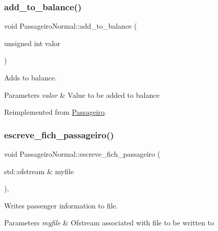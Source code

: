 \subsubsection{\texorpdfstring{add\+\_\+to\+\_\+balance()}{add\_to\_balance()}}
{\footnotesize\ttfamily void Passageiro\+Normal\+::add\+\_\+to\+\_\+balance (\begin{DoxyParamCaption}\item[{unsigned int}]{valor }\end{DoxyParamCaption})\hspace{0.3cm}{\ttfamily [virtual]}}



Adds to balance. 


\begin{DoxyParams}{Parameters}
{\em valor} & Value to be added to balance \\
\hline
\end{DoxyParams}


Reimplemented from \hyperlink{class_passageiro_ac7da59960d323e9bc75dda2e34d7a254}{Passageiro}.

\mbox{\label{class_passageiro_normal_a86e91d053cc146d645dbc8356ea28d35}} 
\subsubsection{\texorpdfstring{escreve\+\_\+fich\+\_\+passageiro()}{escreve\_fich\_passageiro()}}
{\footnotesize\ttfamily void Passageiro\+Normal\+::escreve\+\_\+fich\+\_\+passageiro (\begin{DoxyParamCaption}\item[{std\+::ofstream \&}]{myfile }\end{DoxyParamCaption})\hspace{0.3cm}{\ttfamily [inline]}, {\ttfamily [virtual]}}



Writes passenger information to file. 


\begin{DoxyParams}{Parameters}
{\em myfile} & Ofstream associated with file to be written to \\
\hline
\end{DoxyParams}


